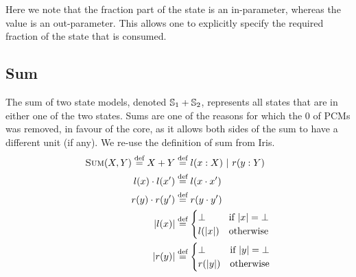 Here we note that the fraction part of the state is an in-parameter, whereas the value is an out-parameter. This allows one to explicitly specify the required fraction of the state that is consumed.

\subsection{Sum}

The sum of two state models, denoted $\mathbb S_1 + \mathbb S_2$, represents all states that are in either one of the two states. Sums are one of the reasons for which the $0$ of PCMs was removed, in favour of the core, as it allows both sides of the sum to have a different unit (if any). We re-use the definition of sum from Iris. \begin{align*}
	\textsc{Sum}(X, Y) \stackrel{\textnormal{def}}= X+Y &\stackrel{\textnormal{def}}= l(x: X) ~|~ r(y: Y)\\
	l(x)\cdot l(x') &\stackrel{\textnormal{def}}= l(x\cdot x')\\
	r(y)\cdot r(y')&\stackrel{\textnormal{def}}= r(y\cdot y')\\
	|l(x)|&\stackrel{\textnormal{def}}= \begin{cases}
 		\bot &\text{if}~ |x|=\bot\\
 		l(|x|) &\text{otherwise}
	 \end{cases}\\
	 |r(y)|&\stackrel{\textnormal{def}}= \begin{cases}
 		\bot &\text{if}~ |y|=\bot\\
 		r(|y|) &\text{otherwise}
	 \end{cases}
\end{align*}

